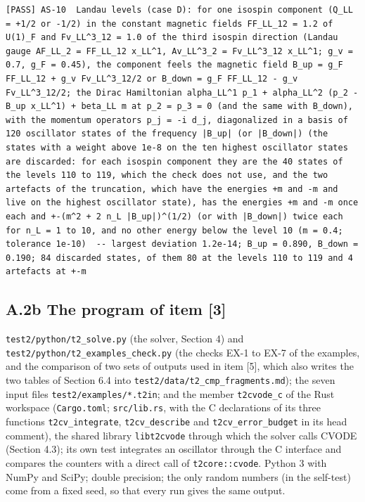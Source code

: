 \documentclass[
  10pt,
]{article}
\begin{document}
\begin{verbatim}
[PASS] AS-10  Landau levels (case D): for one isospin component (Q_LL = +1/2 or -1/2) in the constant magnetic fields FF_LL_12 = 1.2 of U(1)_F and Fv_LL^3_12 = 1.0 of the third isospin direction (Landau gauge AF_LL_2 = FF_LL_12 x_LL^1, Av_LL^3_2 = Fv_LL^3_12 x_LL^1; g_v = 0.7, g_F = 0.45), the component feels the magnetic field B_up = g_F FF_LL_12 + g_v Fv_LL^3_12/2 or B_down = g_F FF_LL_12 - g_v Fv_LL^3_12/2; the Dirac Hamiltonian alpha_LL^1 p_1 + alpha_LL^2 (p_2 - B_up x_LL^1) + beta_LL m at p_2 = p_3 = 0 (and the same with B_down), with the momentum operators p_j = -i d_j, diagonalized in a basis of 120 oscillator states of the frequency |B_up| (or |B_down|) (the states with a weight above 1e-8 on the ten highest oscillator states are discarded: for each isospin component they are the 40 states of the levels 110 to 119, which the check does not use, and the two artefacts of the truncation, which have the energies +m and -m and live on the highest oscillator state), has the energies +m and -m once each and +-(m^2 + 2 n_L |B_up|)^(1/2) (or with |B_down|) twice each for n_L = 1 to 10, and no other energy below the level 10 (m = 0.4; tolerance 1e-10)  -- largest deviation 1.2e-14; B_up = 0.890, B_down = 0.190; 84 discarded states, of them 80 at the levels 110 to 119 and 4 artefacts at +-m
\end{verbatim}

\hypertarget{a.2b-the-program-of-item-3}{%
\subsection{A.2b The program of item
{[}3{]}}\label{a.2b-the-program-of-item-3}}

\texttt{test2/python/t2\_solve.py} (the solver, Section 4) and
\texttt{test2/python/t2\_examples\_check.py} (the checks EX-1 to EX-7 of
the examples, and the comparison of two sets of outputs used in item
{[}5{]}, which also writes the two tables of Section 6.4 into
\texttt{test2/data/t2\_cmp\_fragments.md}); the seven input files
\texttt{test2/examples/*.t2in}; and the member \texttt{t2cvode\_c} of
the Rust workspace (\texttt{Cargo.toml}; \texttt{src/lib.rs}, with the C
declarations of its three functions \texttt{t2cv\_integrate},
\texttt{t2cv\_describe} and \texttt{t2cv\_error\_budget} in its head
comment), the shared library \texttt{libt2cvode} through which the
solver calls CVODE (Section 4.3); its own test integrates an oscillator
through the C interface and compares the counters with a direct call of
\texttt{t2core::cvode}. Python 3 with NumPy and SciPy; double precision;
the only random numbers (in the self-test) come from a fixed seed, so
that every run gives the same output.
\end{document}
